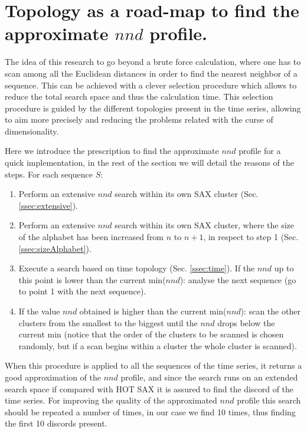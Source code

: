 \documentclass[a4paper,twoside]{article}
\begin{document}
\section{Topology as a road-map to find the approximate $nnd$ profile.}\label{sec:algorithm}

The idea of this research to go beyond a brute force calculation, where one has to scan among all the Euclidean distances in order to find the nearest neighbor of a sequence. This can be achieved with a clever selection procedure which allows to reduce the total search space and thus the calculation time.
This selection procedure is guided by the different topologies present in the time series, allowing to aim more precisely and reducing the problems related with the curse of dimensionality.

Here we introduce the prescription to find the approximate $nnd$ profile for a quick implementation, in the rest of the section we will detail the reasons of the steps. For each sequence $S$:
\begin{enumerate}
 \item Perform an extensive $nnd$ search within its own SAX cluster (Sec. \ref{ssec:extensive}).
 \item Perform an extensive $nnd$ search within its own SAX cluster, where the size of the alphabet has been increased from $n$ to $n+1$, in respect to step 1 (Sec. \ref{ssec:sizeAlphabet}).
  \item Execute a search based on time topology (Sec. \ref{ssec:time}).
   If the $nnd$ up to this point is lower than the current min($nnd$): analyse the next sequence (go to point 1 with the next sequence).
  \item If the value $nnd$ obtained is higher than the current min($nnd$): scan the other clusters from the smallest to the biggest  until the $nnd$ drops below the current min
  (notice that the order of the clusters to be scanned is chosen randomly, but if a scan begins within a cluster the whole cluster is scanned).
\end{enumerate}
%
When this procedure is applied to all the sequences of the time series, it returns a good approximation of the $nnd$ profile, and since the search runs on an extended search space if compared with HOT SAX it is assured to find the discord of the time series. For improving the quality of the approximated $nnd$ profile this search should be repeated a number of times, in our case we find 10 times, thus finding the first 10 discords present.
\end{document}
